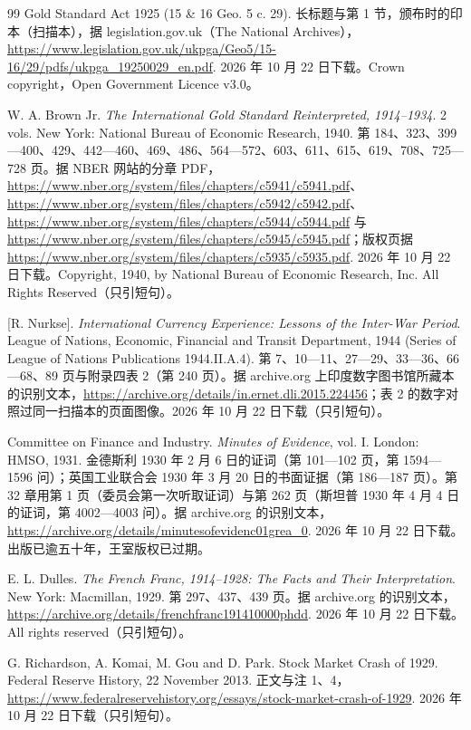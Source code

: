 \begin{thebibliography}{99}
 Gold Standard Act 1925 (15 \& 16 Geo. 5 c. 29). 长标题与第 1 节，颁布时的印本（扫描本），据 legislation.gov.uk（The National Archives），\url{https://www.legislation.gov.uk/ukpga/Geo5/15-16/29/pdfs/ukpga_19250029_en.pdf}. 2026 年 10 月 22 日下载。Crown copyright，Open Government Licence v3.0。

 W. A. Brown Jr. \emph{The International Gold Standard Reinterpreted, 1914--1934}. 2 vols. New York: National Bureau of Economic Research, 1940. 第 184、323、399—400、429、442—460、469、486、564—572、603、611、615、619、708、725—728 页。据 NBER 网站的分章 PDF，\url{https://www.nber.org/system/files/chapters/c5941/c5941.pdf}、\url{https://www.nber.org/system/files/chapters/c5942/c5942.pdf}、\url{https://www.nber.org/system/files/chapters/c5944/c5944.pdf} 与 \url{https://www.nber.org/system/files/chapters/c5945/c5945.pdf}；版权页据 \url{https://www.nber.org/system/files/chapters/c5935/c5935.pdf}. 2026 年 10 月 22 日下载。Copyright, 1940, by National Bureau of Economic Research, Inc. All Rights Reserved（只引短句）。

 [R. Nurkse]. \emph{International Currency Experience: Lessons of the Inter-War Period}. League of Nations, Economic, Financial and Transit Department, 1944 (Series of League of Nations Publications 1944.II.A.4). 第 7、10—11、27—29、33—36、66—68、89 页与附录四表 2（第 240 页）。据 archive.org 上印度数字图书馆所藏本的识别文本，\url{https://archive.org/details/in.ernet.dli.2015.224456}；表 2 的数字对照过同一扫描本的页面图像。2026 年 10 月 22 日下载（只引短句）。

 Committee on Finance and Industry. \emph{Minutes of Evidence}, vol. I. London: HMSO, 1931. 金德斯利 1930 年 2 月 6 日的证词（第 101—102 页，第 1594—1596 问）；英国工业联合会 1930 年 3 月 20 日的书面证据（第 186—187 页）。第 32 章用第 1 页（委员会第一次听取证词）与第 262 页（斯坦普 1930 年 4 月 4 日的证词，第 4002—4003 问）。据 archive.org 的识别文本，\url{https://archive.org/details/minutesofevidenc01grea_0}. 2026 年 10 月 22 日下载。出版已逾五十年，王室版权已过期。

 E. L. Dulles. \emph{The French Franc, 1914--1928: The Facts and Their Interpretation}. New York: Macmillan, 1929. 第 297、437、439 页。据 archive.org 的识别文本，\url{https://archive.org/details/frenchfranc191410000phdd}. 2026 年 10 月 22 日下载。All rights reserved（只引短句）。

 G. Richardson, A. Komai, M. Gou and D. Park. Stock Market Crash of 1929. Federal Reserve History, 22 November 2013. 正文与注 1、4，\url{https://www.federalreservehistory.org/essays/stock-market-crash-of-1929}. 2026 年 10 月 22 日下载（只引短句）。


\end{thebibliography}
